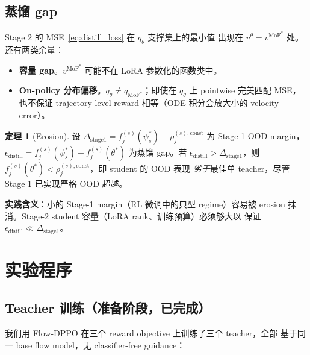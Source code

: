 \documentclass[11pt,a4paper]{article}
\newcommand{\MoF}{\mathrm{MoF}}
\newcommand{\const}{\mathrm{const}}
\theoremstyle{definition}
\newtheorem{theorem}{定理}
\begin{document}
\subsection{蒸馏 gap}
\label{ssec:distill_gap}

Stage 2 的 MSE~\eqref{eq:distill_loss} 在 $q_\theta$ 支撑集上的最小值
出现在 $v^\theta = v^{\MoF^*}$ 处。还有两类余量：

\begin{itemize}[leftmargin=1.5em]
\item \textbf{容量 gap}。$v^{\MoF^*}$ 可能不在 LoRA 参数化的函数类中。
\item \textbf{On-policy 分布偏移}。$q_\theta \neq q_{\MoF^*}$；即使在
$q_\theta$ 上 pointwise 完美匹配 MSE，也不保证 trajectory-level reward
相等（ODE 积分会放大小的 velocity error）。
\end{itemize}

\begin{theorem}[Erosion]
\label{thm:erosion}
设 $\Delta_{\text{stage1}} = f_j^{(s)}(\psi^*_s) - \rho_j^{(s),\const}$
为 Stage-1 OOD margin，$\epsilon_{\text{distill}} = f_j^{(s)}(\psi^*_s)
- f_j^{(s)}(\theta^*)$ 为蒸馏 gap。若
$\epsilon_{\text{distill}} > \Delta_{\text{stage1}}$，则
$f_j^{(s)}(\theta^*) < \rho_j^{(s),\const}$，即 student 的 OOD 表现
\emph{劣于}最佳单 teacher，尽管 Stage 1 已实现严格 OOD 超越。
\end{theorem}

\textbf{实践含义}：小的 Stage-1 margin（RL 微调中的典型 regime）容易被
erosion 抹消。Stage-2 student 容量（LoRA rank、训练预算）必须够大以
保证 $\epsilon_{\text{distill}} \ll \Delta_{\text{stage1}}$。

\section{实验程序}
\label{sec:experiments}

\subsection{Teacher 训练（准备阶段，已完成）}

我们用 Flow-DPPO 在三个 reward objective 上训练了三个 teacher，全部
基于同一 base flow model，无 classifier-free guidance：
\end{document}
